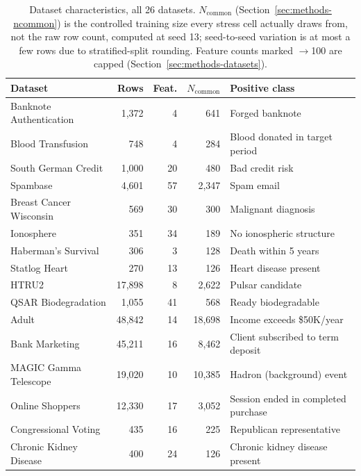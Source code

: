 \begin{table}[t]
\centering
\caption{Dataset characteristics, all 26 datasets. $N_{\text{common}}$
(Section~\ref{sec:methods-ncommon}) is the controlled training size every
stress cell actually draws from, not the raw row count, computed at seed 13;
seed-to-seed variation is at most a few rows due to stratified-split
rounding. Feature counts marked $\to$100 are capped
(Section~\ref{sec:methods-datasets}).}
\label{tab:datasets}
\begin{tabular}{@{}lrrrl@{}}
\toprule
Dataset & Rows & Feat. & $N_{\text{common}}$ & Positive class \\
\midrule
Banknote Authentication      & 1{,}372 & 4  & 641   & Forged banknote \\
Blood Transfusion             & 748    & 4  & 284   & Blood donated in target period \\
South German Credit           & 1{,}000 & 20 & 480   & Bad credit risk \\
Spambase                      & 4{,}601 & 57 & 2{,}347 & Spam email \\
Breast Cancer Wisconsin       & 569    & 30 & 300   & Malignant diagnosis \\
Ionosphere                    & 351    & 34 & 189   & No ionospheric structure \\
Haberman's Survival           & 306    & 3  & 128   & Death within 5 years \\
Statlog Heart                 & 270    & 13 & 126   & Heart disease present \\
HTRU2                         & 17{,}898 & 8 & 2{,}622 & Pulsar candidate \\
QSAR Biodegradation           & 1{,}055 & 41 & 568   & Ready biodegradable \\
Adult                          & 48{,}842 & 14 & 18{,}698 & Income exceeds \$50K/year \\
Bank Marketing                 & 45{,}211 & 16 & 8{,}462  & Client subscribed to term deposit \\
MAGIC Gamma Telescope          & 19{,}020 & 10 & 10{,}385 & Hadron (background) event \\
Online Shoppers                & 12{,}330 & 17 & 3{,}052  & Session ended in completed purchase \\
Congressional Voting           & 435     & 16 & 225    & Republican representative \\
Chronic Kidney Disease         & 400     & 24 & 126    & Chronic kidney disease present \\

\end{tabular}
\end{table}
